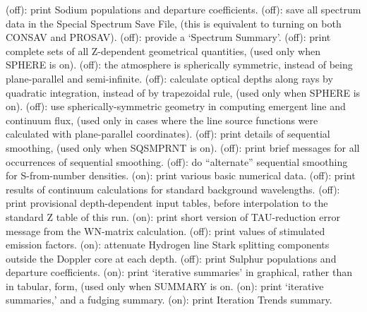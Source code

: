 \space \vbox { (off): \bang
print Sodium populations and departure coefficients.}
\space \vbox { (off): \bang 
save all spectrum data in the Special Spectrum Save File, 
(this is equivalent to turning on both CONSAV and PROSAV).}
\space \vbox { (off): \bang
provide a `Spectrum Summary'.}
\space \vbox { (off): \bang
print complete sets of all Z-dependent geometrical quantities, (used only
when SPHERE is on).}
\space \vbox { (off): \bang
the atmosphere is spherically symmetric, instead of being plane-parallel
and semi-infinite.}
\space \vbox { (off): \bang
calculate optical depths along rays by quadratic integration, instead of by
\break trapezoidal rule, (used only when SPHERE is on).}
\space \vbox { (off): \bang
use spherically-symmetric geometry in computing emergent line and
continuum flux, (used only in cases where the line source functions were
calculated with plane-parallel coordinates).}
\space \vbox { (off): \bang
print details of sequential smoothing, (used only when SQSMPRNT is on).}
\space \vbox { (off): \bang
print brief messages for all occurrences of sequential smoothing.}
\space \vbox { (off): \bang
do ``alternate'' sequential smoothing for S-from-number densities.}
\space \vbox { (on): \bang
print various basic numerical data.}
\space \vbox { (off): \bang
print results of continuum calculations for standard background
wavelengths.}
\space \vbox { (off): \bang
print provisional depth-dependent input tables, before interpolation
to the standard Z table of this run.}
\space \vbox { (on): \bang
print short version of TAU-reduction error message from the WN-matrix
calculation.}
\space \vbox { (off): \bang
print values of stimulated emission factors.}
\space \vbox { (on): \bang
attenuate Hydrogen line Stark splitting components outside the Doppler
core at each depth.}
\space \vbox { (off): \bang
print Sulphur populations and departure coefficients.}
\space \vbox { (on): \bang
print `iterative summaries' in graphical, rather than in tabular, form,
(used only when SUMMARY is on.}
\space \vbox { (on): \bang
print `iterative summaries,' and a fudging summary.}
\space \vbox { (on): \bang
print Iteration Trends summary.}
